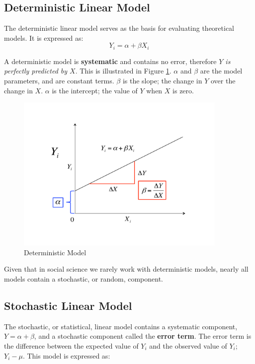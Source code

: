 \documentclass[11pt,openany]{book}\usepackage[]{graphicx}\usepackage[]{color}
\begin{document}
\subsection{Deterministic Linear Model}

The deterministic linear model serves as the basis for evaluating theoretical models. It is expressed as: 
\begin{equation}
Y_{i} = \alpha + \beta X_{i} 
\end{equation}

A deterministic model is \textbf{systematic} and contains no error, therefore \textit{$Y$ is perfectly predicted by $X$}. This is illustrated in Figure \ref{dols}. $\alpha$ and $\beta$ are the model parameters, and are constant terms. $\beta$ is the slope; the change in $Y$ over the change in $X$. $\alpha$ is the intercept; the value of $Y$ when $X$ is zero.  

\begin{figure}
  \centering
  \includegraphics[width=4in]{07_OLSlogic/deterols.pdf}%
  \caption{Deterministic Model \label{dols}}  
\end{figure}

Given that in social science we rarely work with deterministic models, nearly all models contain a stochastic, or random, component. 

\subsection{Stochastic Linear Model} 

The stochastic, or statistical, linear model contains a systematic component, $Y = \alpha+\beta$, and a stochastic component called the \textbf{error term}. The error term is the difference between the expected value of $Y_i$ and the observed value of $Y_i$; $Y_i-\mu$. This model is expressed as: 
\end{document}

